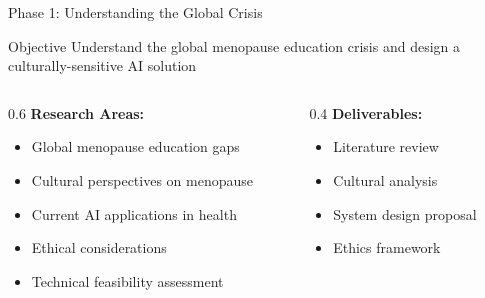 \documentclass[aspectratio=169]{beamer}
\begin{document}
\begin{frame}{Phase 1: Understanding the Global Crisis}
    \begin{block}{Objective}
        Understand the global menopause education crisis and design a culturally-sensitive AI solution
    \end{block}
    
    \begin{columns}[t]
        \begin{column}{0.6\textwidth}
            \textbf{Research Areas:}
            \begin{itemize}
                \item Global menopause education gaps
                \item Cultural perspectives on menopause
                \item Current AI applications in health
                \item Ethical considerations
                \item Technical feasibility assessment
            \end{itemize}
        \end{column}
        \begin{column}{0.4\textwidth}
            \textbf{Deliverables:}
            \begin{itemize}
                \item Literature review
                \item Cultural analysis
                \item System design proposal
                \item Ethics framework
            \end{itemize}
        \end{column}
    \end{columns}
\end{frame}
\end{document}
